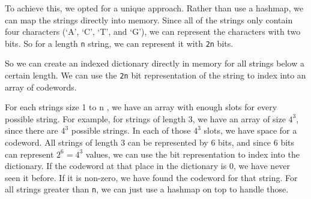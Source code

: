 \documentclass[12pt,twoside]{reedthesis}
\begin{document}
To achieve this, we opted for a unique approach. Rather than use a hashmap, we can map the strings directly into memory. Since all of the strings only contain four characters (`A', `C', `T', and `G'), we can represent the characters with two bits. So for a length \texttt{n} string, we can represent it with \texttt{2n} bits.

So we can create an indexed dictionary directly in memory for all strings below a certain length. We can use the \texttt{2n} bit representation of the string
to index into an array of codewords.

For each strings size 1 to n , we have an array with enough slots for every possible string. For example, for strings of length 3, we have an array of size \(4^3\), since there are \(4^3\) possible strings. In each of those \(4^3\) slots, we have space for a codeword. All strings of length 3 can be represented by 6 bits, and since 6 bits can represent \(2^6=4^3\) values, we can use the bit representation to index into the dictionary. If the codeword at that place in the dictionary is 0, we have never seen it before. If it is non-zero, we have found the codeword for that string. For all strings greater than \texttt{n}, we can just use a hashmap on top to handle those.
\end{document}
